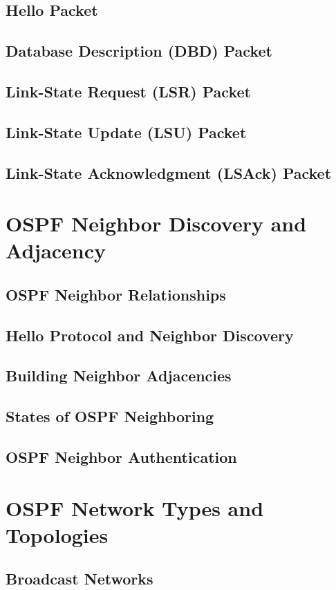 \documentclass{book}
\begin{document}
    \section{Hello Packet}
    \section{Database Description (DBD) Packet}
    \section{Link-State Request (LSR) Packet}
    \section{Link-State Update (LSU) Packet}
    \section{Link-State Acknowledgment (LSAck) Packet}
    
\chapter{OSPF Neighbor Discovery and Adjacency}
    \section{OSPF Neighbor Relationships}
    \section{Hello Protocol and Neighbor Discovery}
    \section{Building Neighbor Adjacencies}
    \section{States of OSPF Neighboring}
    \section{OSPF Neighbor Authentication}

\chapter{OSPF Network Types and Topologies}
    \section{Broadcast Networks}
\end{document}

